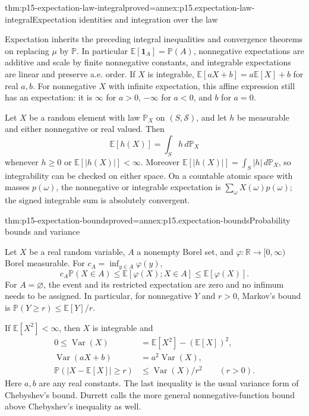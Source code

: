 \begin{hbtheorem}{thm:p15-expectation-law-integral}{proved=annex:p15.expectation-law-integral}{Expectation identities and integration over the law}
\par\nobreak
Expectation inherits the preceding integral inequalities and convergence
theorems on replacing \(\mu\) by \(\mathbb P\). In particular
\(\mathbb E[\mathbf1_A]=\mathbb P(A)\), nonnegative expectations
are additive and scale by finite nonnegative constants, and integrable
expectations are linear and preserve a.e. order. If \(X\) is integrable,
\(\mathbb E[aX+b]=a\mathbb E[X]+b\) for real \(a,b\).
For nonnegative \(X\) with infinite expectation, this affine expression
still has an expectation: it is \(\infty\) for \(a>0\),
\(-\infty\) for \(a<0\), and \(b\) for \(a=0\).

Let \(X\) be a random element with law \(\mathbb P_X\) on
\((S,\mathcal S)\), and let \(h\) be measurable and either
nonnegative or real valued. Then
\[
 \mathbb E[h(X)]=\int_S h\,d\mathbb P_X
\]
whenever \(h\geq0\) or \(\mathbb E[|h(X)|]<\infty\).
Moreover \(\mathbb E[|h(X)|]=\int_S|h|\,d\mathbb P_X\), so
integrability can be checked on either space. On a countable atomic
space with masses \(p(\omega)\), the nonnegative or integrable
expectation is \(\sum_\omega X(\omega)p(\omega)\); the signed
integrable sum is absolutely convergent.
\end{hbtheorem}

\begin{hbtheorem}{thm:p15-expectation-bounds}{proved=annex:p15.expectation-bounds}{Probability bounds and variance}
\par\nobreak
Let \(X\) be a real random variable, \(A\) a nonempty Borel set,
and \(\varphi:\mathbb R\to[0,\infty)\) Borel measurable. For
\(c_A=\inf_{y\in A}\varphi(y)\),
\[
 c_A\mathbb P(X\in A)\leq
 \mathbb E[\varphi(X);X\in A]\leq\mathbb E[\varphi(X)].
\]
For \(A=\varnothing\), the event and its restricted expectation are
zero and no infimum needs to be assigned. In particular, for nonnegative
\(Y\) and \(r>0\), Markov's bound is
\(\mathbb P(Y\geq r)\leq\mathbb E[Y]/r\).

If \(\mathbb E[X^2]<\infty\), then \(X\) is integrable and
\[
 \begin{aligned}
 0\leq\operatorname{Var}(X)&=\mathbb E[X^2]-(\mathbb E[X])^2,\\
 \operatorname{Var}(aX+b)&=a^2\operatorname{Var}(X),\\
 \mathbb P(|X-\mathbb E[X]|\geq r)&\leq
                         \operatorname{Var}(X)/r^2\qquad(r>0).
 \end{aligned}
\]
Here \(a,b\) are any real constants. The last inequality is the
usual variance form of Chebyshev's bound. Durrett calls the more general
nonnegative-function bound above Chebyshev's inequality as well.
\end{hbtheorem}

